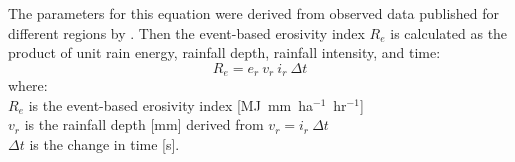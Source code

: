 \documentclass[gmd, manuscript]{copernicus}
\begin{document}
\noindent
The parameters for this equation were derived from observed data
published for different regions by \cite{Panagos2017}.
\noindent
Then the event-based erosivity index $R_e$ 
is calculated as the product of 
unit rain energy, rainfall depth, rainfall intensity, and time: 
\begin{equation}
\label{eq:erosivity_index}
{R_e = e_r ~ v_r ~ i_r ~ \Delta t}
\end{equation}
%
{\small
\noindent
where: \\
\hspace*{0.5em} $R_e$ is the event-based erosivity index [\unit{MJ~mm~ha}$^{-1}$~\unit{hr}$^{-1}$]\\
\hspace*{0.5em} $v_r$ is the rainfall depth [\unit{mm}] derived from ${v_r = i_r~\Delta t}$\\
\hspace*{0.5em} $\Delta t$ is the change in time [\unit{s}].
}



\end{document}
